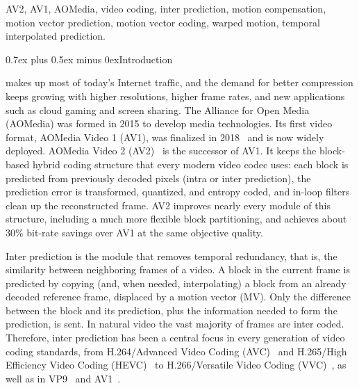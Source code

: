 \documentclass[journal]{IEEEtran}
\makeatletter
\def\section{\@startsection{section}{1}{\z@}{2.5ex plus 1ex minus 1ex}%
{0.7ex plus 0.5ex minus 0ex}{\normalfont\normalsize\centering\scshape}}%
\makeatother
\begin{document}
\begin{IEEEkeywords}
AV2, AV1, AOMedia, video coding, inter prediction, motion compensation,
motion vector prediction, motion vector coding, warped motion, temporal
interpolated prediction.
\end{IEEEkeywords}

\section{Introduction}
\label{sec:intro}

 makes up most of today's Internet traffic, and the
demand for better compression keeps growing with higher resolutions, higher
frame rates, and new applications such as cloud gaming and screen sharing.
The Alliance for Open Media (AOMedia) was formed in 2015 to develop media
technologies. Its first video format, AOMedia Video 1 (AV1), was finalized in
2018~\cite{av1,av1core} and is now widely deployed. AOMedia Video 2
(AV2)~\cite{av2spec} is the
successor of AV1. It keeps the block-based hybrid coding structure that every
modern video codec uses: each block is predicted from previously decoded pixels
(intra or inter prediction), the prediction error is transformed, quantized,
and entropy coded, and in-loop filters clean up the reconstructed frame. AV2
improves nearly every module of this structure, including a much more flexible
block partitioning, and achieves about 30\% bit-rate savings over AV1 at the
same objective quality.

Inter prediction is the module that removes temporal redundancy, that is, the
similarity between neighboring frames of a video. A block in the current frame
is predicted by copying (and, when needed, interpolating) a block from an
already decoded reference frame, displaced by a motion vector (MV). Only the
difference between the block and its prediction, plus the information needed
to form the prediction, is sent. In natural video the vast majority of frames are inter coded.
Therefore, inter prediction has been a central focus in every generation of
video coding standards, from H.264/Advanced Video Coding (AVC)~\cite{h264} and
H.265/High Efficiency Video Coding (HEVC)~\cite{HEVC} to H.266/Versatile Video
Coding (VVC)~\cite{VVC}, as well as in VP9~\cite{VP9} and AV1~\cite{av1}.
\end{document}
